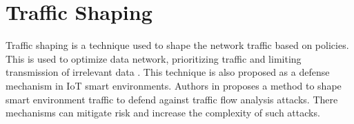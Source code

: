 \section{Traffic Shaping}
Traffic shaping is a technique used to shape the network traffic based on policies. This is used to optimize data network, prioritizing traffic and limiting transmission of irrelevant data \cite{traffic_shaping_saeed2017carousel}. This technique is also proposed as a defense mechanism in IoT smart environments. Authors in \cite{traffic_shaping_xiong2022network} proposes a method to shape smart environment traffic to defend against traffic flow analysis attacks. There mechanisms can mitigate risk and increase the complexity of such attacks. 




